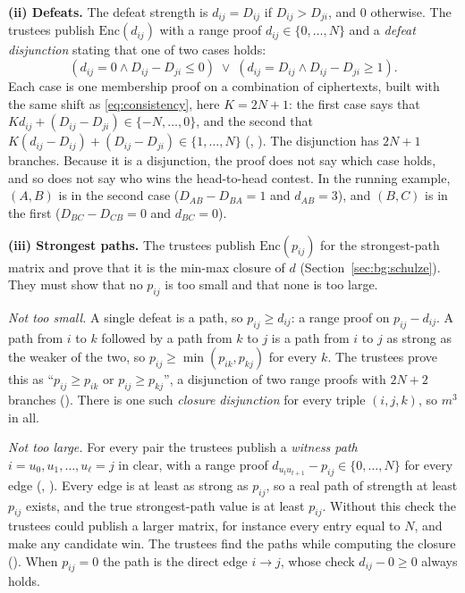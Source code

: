 \textbf{(ii) Defeats.} The defeat strength is $d_{ij} = D_{ij}$ if
$D_{ij} > D_{ji}$, and $0$ otherwise. The trustees publish
$\mathrm{Enc}(d_{ij})$ with a range proof $d_{ij} \in \{0, \ldots, N\}$
and a \emph{defeat disjunction} stating that one of two cases holds:
\[
  (d_{ij} = 0 \wedge D_{ij} - D_{ji} \le 0)
  \;\vee\;
  (d_{ij} = D_{ij} \wedge D_{ij} - D_{ji} \ge 1).
\]
Each case is one membership proof on a combination of ciphertexts, built
with the same shift as \eqref{eq:consistency}, here $K = 2N + 1$: the
first case says that $K d_{ij} + (D_{ij} - D_{ji}) \in \{-N, \ldots,
0\}$, and the second that $K (d_{ij} - D_{ij}) + (D_{ij} - D_{ji}) \in
\{1, \ldots, N\}$ (, ). The
disjunction has $2N + 1$ branches. Because it is a disjunction, the proof
does not say which case holds, and so does not say who wins the
head-to-head contest. In the running example, $(A, B)$ is in the second
case ($D_{AB} - D_{BA} = 1$ and $d_{AB} = 3$), and $(B, C)$ is in the
first ($D_{BC} - D_{CB} = 0$ and $d_{BC} = 0$).

\textbf{(iii) Strongest paths.} The trustees publish
$\mathrm{Enc}(p_{ij})$ for the strongest-path matrix and prove that it is
the min-max closure of $d$ (Section~\ref{sec:bg:schulze}). They must show
that no $p_{ij}$ is too small and that none is too large.

\emph{Not too small.} A single defeat is a path, so $p_{ij} \ge d_{ij}$:
a range proof on $p_{ij} - d_{ij}$. A path from $i$ to $k$ followed by a
path from $k$ to $j$ is a path from $i$ to $j$ as strong as the weaker of
the two, so $p_{ij} \ge \min(p_{ik}, p_{kj})$ for every $k$. The trustees
prove this as ``$p_{ij} \ge p_{ik}$ or $p_{ij} \ge p_{kj}$'', a
disjunction of two range proofs with $2N + 2$ branches
(). There is one such \emph{closure disjunction}
for every triple $(i, j, k)$, so $m^3$ in all.

\emph{Not too large.} For every pair the trustees publish a \emph{witness
path} $i = u_0, u_1, \ldots, u_\ell = j$ in clear, with a range proof
$d_{u_t u_{t+1}} - p_{ij} \in \{0, \ldots, N\}$ for every edge
(, ). Every edge is at least as
strong as $p_{ij}$, so a real path of strength at least $p_{ij}$ exists,
and the true strongest-path value is at least $p_{ij}$. Without this
check the trustees could publish a larger matrix, for instance every
entry equal to $N$, and make any candidate win. The trustees find the
paths while computing the closure (). When $p_{ij} =
0$ the path is the direct edge $i \to j$, whose check $d_{ij} - 0 \ge 0$
always holds.

